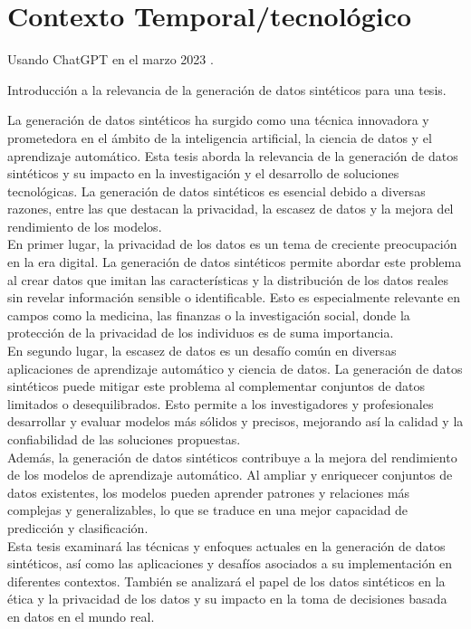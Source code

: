 \newpage
\section{Contexto Temporal/tecnológico}

Usando ChatGPT en el marzo 2023 \cite{openai_chatgpt_2023}.
\begin{prompt}
    Introducción a la relevancia de la generación de datos sintéticos para una tesis.
\end{prompt}

\begin{chatGPT}
La generación de datos sintéticos ha surgido como una técnica innovadora y prometedora en el ámbito de la inteligencia artificial, la ciencia de datos y el aprendizaje automático. Esta tesis aborda la relevancia de la generación de datos sintéticos y su impacto en la investigación y el desarrollo de soluciones tecnológicas. La generación de datos sintéticos es esencial debido a diversas razones, entre las que destacan la privacidad, la escasez de datos y la mejora del rendimiento de los modelos. \\

En primer lugar, la privacidad de los datos es un tema de creciente preocupación en la era digital. La generación de datos sintéticos permite abordar este problema al crear datos que imitan las características y la distribución de los datos reales sin revelar información sensible o identificable. Esto es especialmente relevante en campos como la medicina, las finanzas o la investigación social, donde la protección de la privacidad de los individuos es de suma importancia. \\

En segundo lugar, la escasez de datos es un desafío común en diversas aplicaciones de aprendizaje automático y ciencia de datos. La generación de datos sintéticos puede mitigar este problema al complementar conjuntos de datos limitados o desequilibrados. Esto permite a los investigadores y profesionales desarrollar y evaluar modelos más sólidos y precisos, mejorando así la calidad y la confiabilidad de las soluciones propuestas. \\

Además, la generación de datos sintéticos contribuye a la mejora del rendimiento de los modelos de aprendizaje automático. Al ampliar y enriquecer conjuntos de datos existentes, los modelos pueden aprender patrones y relaciones más complejas y generalizables, lo que se traduce en una mejor capacidad de predicción y clasificación.\\

Esta tesis examinará las técnicas y enfoques actuales en la generación de datos sintéticos, así como las aplicaciones y desafíos asociados a su implementación en diferentes contextos. También se analizará el papel de los datos sintéticos en la ética y la privacidad de los datos y su impacto en la toma de decisiones basada en datos en el mundo real.
\end{chatGPT}
\newpage

